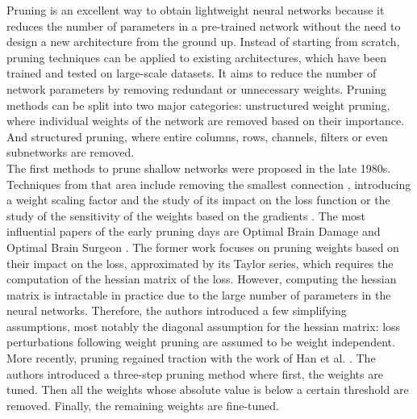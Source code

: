 Pruning is an excellent way to obtain lightweight neural networks because it
reduces the number of parameters in a pre-trained network without the need to
design a new architecture from the ground up. Instead of starting from scratch,
pruning techniques can be applied to existing architectures, which have been
trained and tested on large-scale datasets. It aims to reduce the number of
network parameters by removing redundant or unnecessary weights. Pruning methods
can be split into two major categories: unstructured weight pruning, where
individual weights of the network are removed based on their importance. And
structured pruning, where entire columns, rows, channels, filters or even
subnetworks are removed. \\


The first methods to prune shallow networks were proposed in the late 1980s.
Techniques from that area include removing the smallest connection
\cite{janowsky1989pruning}, introducing a weight scaling factor and the study of
its impact on the loss function \cite{DBLP:conf/nips/MozerS88} or the study of
the sensitivity of the weights based on the gradients
\cite{DBLP:journals/tnn/Karnin90}. The most influential papers of the early
pruning days are Optimal Brain Damage \cite{DBLP:conf/nips/CunDS89} and Optimal
Brain Surgeon
\cite{DBLP:conf/nips/HassibiS92,DBLP:conf/nips/HassibiSW93,DBLP:conf/icnn/HassibiSW93}.
The former work focuses on pruning weights based on their impact on the loss,
approximated by its Taylor series, which requires the computation of the hessian
matrix of the loss. However, computing the hessian matrix is intractable in
practice due to the large number of parameters in the neural networks.
Therefore, the authors introduced a few simplifying assumptions, most notably
the diagonal assumption for the hessian matrix: loss perturbations following
weight pruning are assumed to be weight independent. \\


More recently, pruning regained traction with the work of Han et al.
\cite{DBLP:conf/nips/HanPTD15}. The authors introduced a three-step pruning
method where first, the weights are tuned. Then all the weights whose absolute
value is below a certain threshold are removed. Finally, the remaining weights
are fine-tuned. \\


